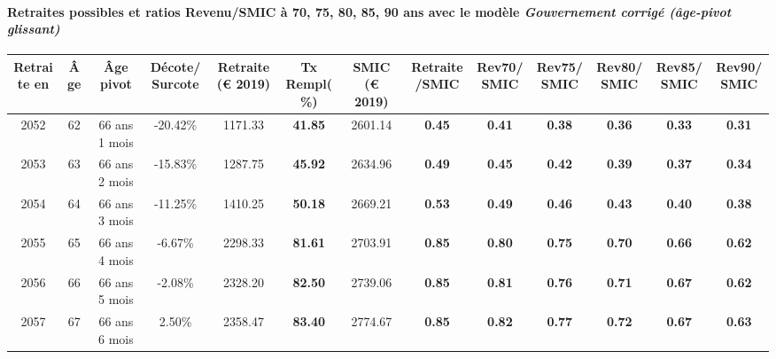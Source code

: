 \paragraph{Retraites possibles et ratios Revenu/SMIC à 70, 75, 80, 85, 90 ans avec le modèle \emph{Gouvernement corrigé (âge-pivot glissant)}}  
 
{ \scriptsize \begin{center} 
\begin{tabular}[htb]{|c|c||c|c||c|c||c||c|c|c|c|c|c|} 
\hline 
 Retraite en &  Âge &  Âge pivot &  Décote/Surcote &  Retraite (\euro{} 2019) &  Tx Rempl(\%) &  SMIC (\euro{} 2019) &  Retraite/SMIC &  Rev70/SMIC &  Rev75/SMIC &  Rev80/SMIC &  Rev85/SMIC &  Rev90/SMIC \\ 
\hline \hline 
 2052 &  62 &  66 ans 1 mois &  -20.42\% &  1171.33 &  {\bf 41.85} &  2601.14 &  {\bf {\color{red} 0.45}} &  {\bf {\color{red} 0.41}} &  {\bf {\color{red} 0.38}} &  {\bf {\color{red} 0.36}} &  {\bf {\color{red} 0.33}} &  {\bf {\color{red} 0.31}} \\ 
\hline 
 2053 &  63 &  66 ans 2 mois &  -15.83\% &  1287.75 &  {\bf 45.92} &  2634.96 &  {\bf {\color{red} 0.49}} &  {\bf {\color{red} 0.45}} &  {\bf {\color{red} 0.42}} &  {\bf {\color{red} 0.39}} &  {\bf {\color{red} 0.37}} &  {\bf {\color{red} 0.34}} \\ 
\hline 
 2054 &  64 &  66 ans 3 mois &  -11.25\% &  1410.25 &  {\bf 50.18} &  2669.21 &  {\bf {\color{red} 0.53}} &  {\bf {\color{red} 0.49}} &  {\bf {\color{red} 0.46}} &  {\bf {\color{red} 0.43}} &  {\bf {\color{red} 0.40}} &  {\bf {\color{red} 0.38}} \\ 
\hline 
 2055 &  65 &  66 ans 4 mois &  -6.67\% &  2298.33 &  {\bf 81.61} &  2703.91 &  {\bf {\color{red} 0.85}} &  {\bf {\color{red} 0.80}} &  {\bf {\color{red} 0.75}} &  {\bf {\color{red} 0.70}} &  {\bf {\color{red} 0.66}} &  {\bf {\color{red} 0.62}} \\ 
\hline 
 2056 &  66 &  66 ans 5 mois &  -2.08\% &  2328.20 &  {\bf 82.50} &  2739.06 &  {\bf {\color{red} 0.85}} &  {\bf {\color{red} 0.81}} &  {\bf {\color{red} 0.76}} &  {\bf {\color{red} 0.71}} &  {\bf {\color{red} 0.67}} &  {\bf {\color{red} 0.62}} \\ 
\hline 
 2057 &  67 &  66 ans 6 mois &  2.50\% &  2358.47 &  {\bf 83.40} &  2774.67 &  {\bf {\color{red} 0.85}} &  {\bf {\color{red} 0.82}} &  {\bf {\color{red} 0.77}} &  {\bf {\color{red} 0.72}} &  {\bf {\color{red} 0.67}} &  {\bf {\color{red} 0.63}} \\ 
\hline 
\hline 
\end{tabular} 
\end{center} } 
